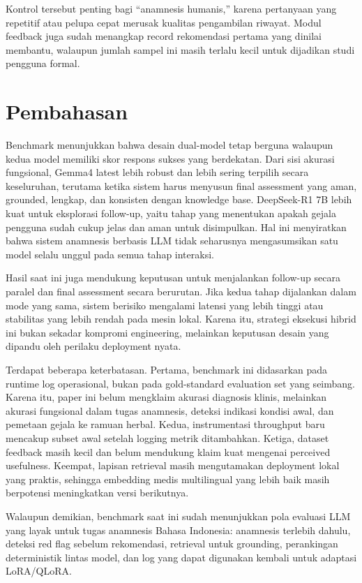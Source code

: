 \documentclass[conference]{IEEEtran}
\begin{document}
Kontrol tersebut penting bagi ``anamnesis humanis,'' karena pertanyaan yang repetitif atau pelupa cepat merusak kualitas pengambilan riwayat. Modul feedback juga sudah menangkap record rekomendasi pertama yang dinilai membantu, walaupun jumlah sampel ini masih terlalu kecil untuk dijadikan studi pengguna formal.

\section{Pembahasan}
Benchmark menunjukkan bahwa desain dual-model tetap berguna walaupun kedua model memiliki skor respons sukses yang berdekatan. Dari sisi akurasi fungsional, Gemma4 latest lebih robust dan lebih sering terpilih secara keseluruhan, terutama ketika sistem harus menyusun final assessment yang aman, grounded, lengkap, dan konsisten dengan knowledge base. DeepSeek-R1 7B lebih kuat untuk eksplorasi follow-up, yaitu tahap yang menentukan apakah gejala pengguna sudah cukup jelas dan aman untuk disimpulkan. Hal ini menyiratkan bahwa sistem anamnesis berbasis LLM tidak seharusnya mengasumsikan satu model selalu unggul pada semua tahap interaksi.

Hasil saat ini juga mendukung keputusan untuk menjalankan follow-up secara paralel dan final assessment secara berurutan. Jika kedua tahap dijalankan dalam mode yang sama, sistem berisiko mengalami latensi yang lebih tinggi atau stabilitas yang lebih rendah pada mesin lokal. Karena itu, strategi eksekusi hibrid ini bukan sekadar kompromi engineering, melainkan keputusan desain yang dipandu oleh perilaku deployment nyata.

Terdapat beberapa keterbatasan. Pertama, benchmark ini didasarkan pada runtime log operasional, bukan pada gold-standard evaluation set yang seimbang. Karena itu, paper ini belum mengklaim akurasi diagnosis klinis, melainkan akurasi fungsional dalam tugas anamnesis, deteksi indikasi kondisi awal, dan pemetaan gejala ke ramuan herbal. Kedua, instrumentasi throughput baru mencakup subset awal setelah logging metrik ditambahkan. Ketiga, dataset feedback masih kecil dan belum mendukung klaim kuat mengenai perceived usefulness. Keempat, lapisan retrieval masih mengutamakan deployment lokal yang praktis, sehingga embedding medis multilingual yang lebih baik masih berpotensi meningkatkan versi berikutnya.

Walaupun demikian, benchmark saat ini sudah menunjukkan pola evaluasi LLM yang layak untuk tugas anamnesis Bahasa Indonesia: anamnesis terlebih dahulu, deteksi red flag sebelum rekomendasi, retrieval untuk grounding, perankingan deterministik lintas model, dan log yang dapat digunakan kembali untuk adaptasi LoRA/QLoRA.
\end{document}
